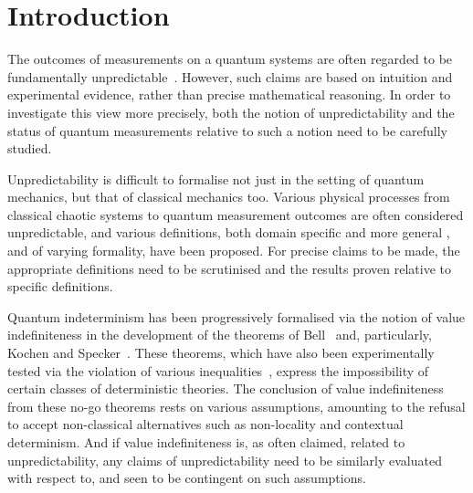 \documentclass[%
 superscriptaddress,
 preprint,
 showpacs,
 showkeys,
 preprintnumbers,
  amsmath,amssymb,
  aps,
 pra,
  longbibliography,
  floatfix,
 ]{revtex4-1}
\theoremstyle{definition}
\begin{document}
\pacs{}

\maketitle


\section{Introduction}

The outcomes of measurements on a quantum systems are often regarded to be fundamentally unpredictable~\cite{zeil-05_nature_ofQuantum}.
However, such claims are based on intuition and experimental evidence, rather than precise mathematical reasoning.
In order to investigate this view more precisely, both the notion of unpredictability and the status of quantum measurements relative to such a notion need to be carefully studied.

Unpredictability is difficult to formalise not just in the setting of quantum mechanics, but that of classical mechanics too.
Various physical processes from classical chaotic systems to quantum measurement outcomes are often considered unpredictable, and various definitions, both domain specific \cite{Werndl:2009nx} and more general \cite{Eagle:2005ys}, and of varying formality, have been proposed.
For precise claims to be made, the appropriate definitions need to be scrutinised and the results proven relative to specific definitions.

Quantum indeterminism has been progressively formalised via the notion of value indefiniteness in the development of the theorems of Bell~\cite{bell-66} and, particularly,  Kochen and Specker~\cite{kochen1}.
These theorems, which have also been experimentally tested via the violation of various inequalities~\cite{wjswz-98}, express the impossibility of certain classes of deterministic theories.
The conclusion of value indefiniteness from these no-go theorems rests on various assumptions, amounting to the refusal to accept non-classical alternatives such as non-locality and contextual determinism.
And if value indefiniteness is, as often claimed, related to unpredictability, any claims of unpredictability need to be similarly evaluated with respect to, and seen to be contingent on such assumptions.
\end{document}
